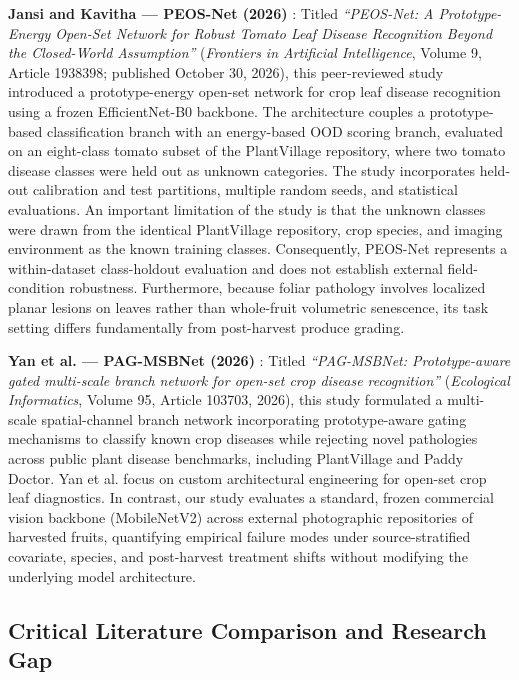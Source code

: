\textbf{Jansi and Kavitha --- PEOS-Net (2026)} \cite{jansi2026peos}: Titled \textit{``PEOS-Net: A Prototype-Energy Open-Set Network for Robust Tomato Leaf Disease Recognition Beyond the Closed-World Assumption''} (\textit{Frontiers in Artificial Intelligence}, Volume 9, Article 1938398; published October 30, 2026), this peer-reviewed study introduced a prototype-energy open-set network for crop leaf disease recognition using a frozen EfficientNet-B0 backbone. The architecture couples a prototype-based classification branch with an energy-based OOD scoring branch, evaluated on an eight-class tomato subset of the PlantVillage repository, where two tomato disease classes were held out as unknown categories. The study incorporates held-out calibration and test partitions, multiple random seeds, and statistical evaluations. An important limitation of the study is that the unknown classes were drawn from the identical PlantVillage repository, crop species, and imaging environment as the known training classes. Consequently, PEOS-Net represents a within-dataset class-holdout evaluation and does not establish external field-condition robustness. Furthermore, because foliar pathology involves localized planar lesions on leaves rather than whole-fruit volumetric senescence, its task setting differs fundamentally from post-harvest produce grading.

\textbf{Yan et al. --- PAG-MSBNet (2026)} \cite{yan2026pagmsbnet}: Titled \textit{``PAG-MSBNet: Prototype-aware gated multi-scale branch network for open-set crop disease recognition''} (\textit{Ecological Informatics}, Volume 95, Article 103703, 2026), this study formulated a multi-scale spatial-channel branch network incorporating prototype-aware gating mechanisms to classify known crop diseases while rejecting novel pathologies across public plant disease benchmarks, including PlantVillage and Paddy Doctor. Yan et al. focus on custom architectural engineering for open-set crop leaf diagnostics. In contrast, our study evaluates a standard, frozen commercial vision backbone (MobileNetV2) across external photographic repositories of harvested fruits, quantifying empirical failure modes under source-stratified covariate, species, and post-harvest treatment shifts without modifying the underlying model architecture.

\subsection{Critical Literature Comparison and Research Gap}
\label{sec:lit_table_and_gap}

